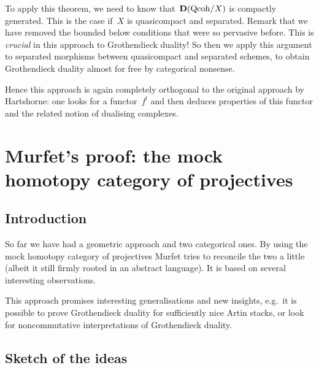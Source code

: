 To apply this theorem, we need to know that~$\mathbf{D}(\mathrm{Qcoh}/X)$ is compactly generated. This is the case if~$X$ is quasicompact and separated. Remark that we have removed the bounded below conditions that were so pervasive before. This is \emph{crucial} in this approach to Grothendieck duality! So then we apply this argument to separated morphisms between quasicompact and separated schemes, to obtain Grothendieck duality almost for free by categorical nonsense.

Hence this approach is again completely orthogonal to the original approach by Hartshorne: one looks for a functor~$f^!$ and then deduces properties of this functor and the related notion of dualising complexes.

\section{Murfet's proof: the mock homotopy category of projectives}
\label{section:murfet}
\subsection{Introduction}
So far we have had a geometric approach and two categorical ones. By using the mock homotopy category of projectives Murfet tries to reconcile the two a little (albeit it still firmly rooted in an abstract language). It is based on several interesting observations.

This approach promises interesting generalisations and new insights, e.g.\ it is possible to prove Grothendieck duality for sufficiently nice Artin stacks, or look for noncommutative interpretations of Grothendieck duality.

\subsection{Sketch of the ideas}
